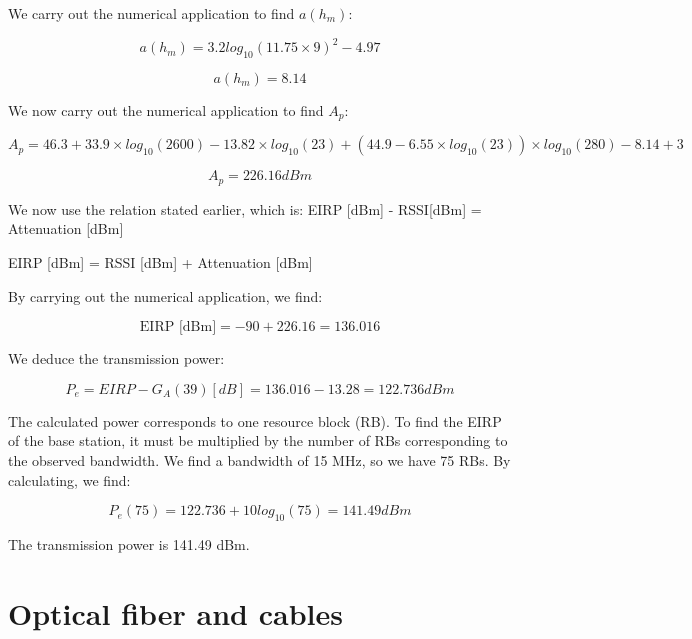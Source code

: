 \documentclass[12]{article}
\begin{document}
We carry out the numerical application to find $a(h_{m})$:

\begin{equation*}
    a(h_{m}) = 3.2 log_{10}(11.75 \times 9)^2 - 4.97
\end{equation*}

\begin{equation*}
    a(h_{m}) = 8.14
\end{equation*}

We now carry out the numerical application to find $A_{p}$:

\begin{equation*}
    A_{p} = 46.3 + 33.9 \times log_{10}(2600) - 13.82 \times log_{10}(23) + (44.9 - 6.55 \times log_{10}(23) )\times log_{10}(280) - 8.14 + 3
\end{equation*}

\begin{equation*}
    A_{p} = 226.16 dBm
\end{equation*}

We now use the relation stated earlier, which is: EIRP [dBm] - RSSI[dBm] = Attenuation [dBm]

EIRP [dBm] = RSSI [dBm] + Attenuation [dBm]

By carrying out the numerical application, we find:

\begin{equation*}
    \text{EIRP [dBm]} = -90 + 226.16 = 136.016
\end{equation*}

We deduce the transmission power:

\begin{equation*}
    P_{e} = EIRP - G_{A}(39)[dB] = 136.016 - 13.28 = 122.736 dBm
\end{equation*}

The calculated power corresponds to one resource block (RB). To find the EIRP of the base station, it must be multiplied by the number of RBs corresponding to the observed bandwidth. We find a bandwidth of 15 MHz, so we have 75 RBs. By calculating, we find:

\begin{equation*}
    P_{e}(75) = 122.736 + 10 log_{10}(75) = 141.49 dBm
\end{equation*}

The transmission power is 141.49 dBm.

\section{Optical fiber and cables}
\end{document}
